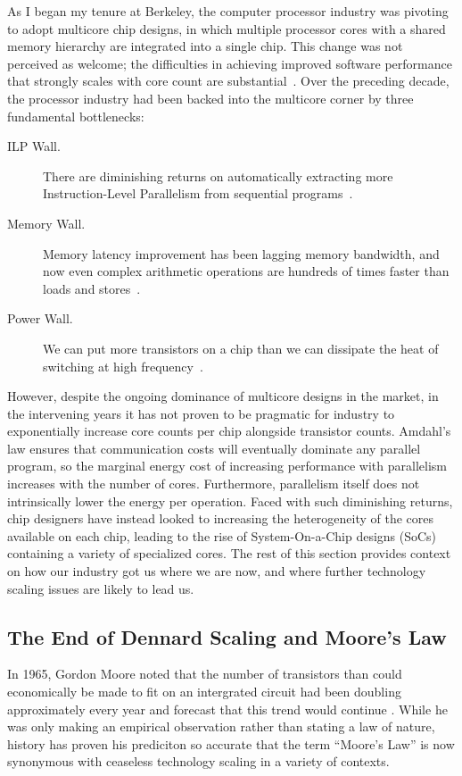 As I began my tenure at Berkeley, the computer processor industry was pivoting to adopt multicore chip designs,
in which multiple processor cores with a shared memory hierarchy are integrated into a single chip.
This change was not perceived as welcome; the difficulties in achieving improved software performance that strongly scales with core count are substantial~\cite{Asanovic:EECS-2006-183}.
Over the preceding decade, the processor industry had been backed into the multicore corner by three fundamental bottlenecks:
\begin{description}
\item[ILP Wall.] There are diminishing returns on automatically extracting more Instruction-Level Parallelism from sequential programs~\cite{hennessy2011computer}.
\item[Memory Wall.] Memory latency improvement has been lagging memory bandwidth, and now even complex arithmetic operations are hundreds of times faster than loads and stores~\cite{wulf1995hitting}.
\item[Power Wall.] We can put more transistors on a chip than we can dissipate the heat of switching at high frequency~\cite{shacham-micro10}.
\end{description}

However, despite the ongoing dominance of multicore designs in the market, in the intervening years it has not proven to be pragmatic for industry to exponentially increase core counts per chip alongside transistor counts.
Amdahl's law ensures that communication costs will eventually dominate any parallel program, so the marginal energy cost of increasing performance with parallelism increases with the number of cores.
Furthermore, parallelism itself does not intrinsically lower the energy per operation.
Faced with such diminishing returns, chip designers have instead looked to increasing the heterogeneity of the cores available on each chip, leading to the rise of System-On-a-Chip designs (SoCs) containing a variety of specialized cores.
The rest of this section provides context on how our industry got us where we are now, and where further technology scaling issues are likely to lead us.

\subsection{The End of Dennard Scaling and Moore's Law}

In 1965, Gordon Moore noted that the number of transistors than could economically be made to fit on an intergrated circuit had been doubling approximately every year and forecast that this trend would continue \cite{moore2006cramming}.
While he was only making an empirical observation rather than stating a law of nature, history has proven his prediciton so accurate that the term ``Moore's Law'' is now synonymous with ceaseless technology scaling in a variety of contexts.

